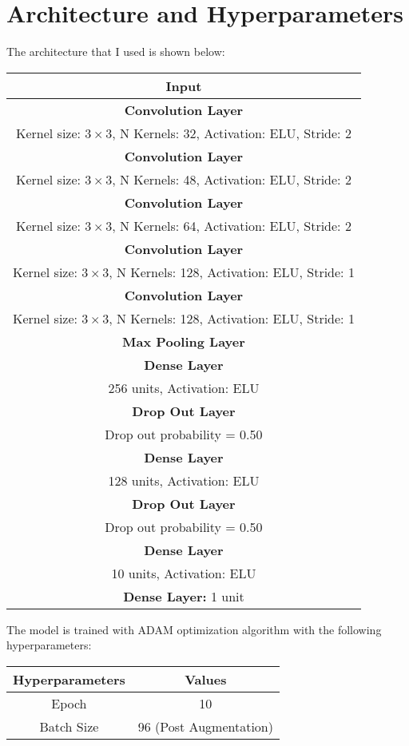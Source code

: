 \documentclass[12pt,twoside]{article}
\begin{document}
\newpage

\section{Architecture and Hyperparameters}
The architecture that I used is shown below:

\begin{center}
\begin{tabular}{|c|}
\hline
\textbf{Input} \\\hline
\textbf{Convolution Layer} \\
Kernel size: $3\times 3$, N Kernels: 32, Activation: ELU, Stride: 2\\\hline
\textbf{Convolution Layer} \\
Kernel size: $3\times 3$, N Kernels: 48, Activation: ELU, Stride: 2\\\hline
\textbf{Convolution Layer} \\
Kernel size: $3\times 3$, N Kernels: 64, Activation: ELU, Stride: 2\\\hline
\textbf{Convolution Layer} \\
Kernel size: $3\times 3$, N Kernels: 128, Activation: ELU, Stride: 1\\\hline
\textbf{Convolution Layer} \\
Kernel size: $3\times 3$, N Kernels: 128, Activation: ELU, Stride: 1\\\hline
\textbf{Max Pooling Layer} \\\hline
\textbf{Dense Layer} \\
256 units, Activation: ELU \\\hline
\textbf{Drop Out Layer}\\
Drop out probability = 0.50 \\\hline
\textbf{Dense Layer} \\
128 units, Activation: ELU \\\hline
\textbf{Drop Out Layer}\\
Drop out probability = 0.50 \\\hline
\textbf{Dense Layer} \\
10 units, Activation: ELU \\\hline
\textbf{Dense Layer:} 1 unit \\\hline
\end{tabular}
\end{center}

The model is trained with ADAM optimization algorithm with the following hyperparameters:

\begin{center}
\begin{tabular}{|c|c|}
\hline
Hyperparameters		& 		Values\\\hline
Epoch						&		10\\
Batch Size				&		96 (Post Augmentation)\\\hline
\end{tabular}
\end{center}
\end{document}
